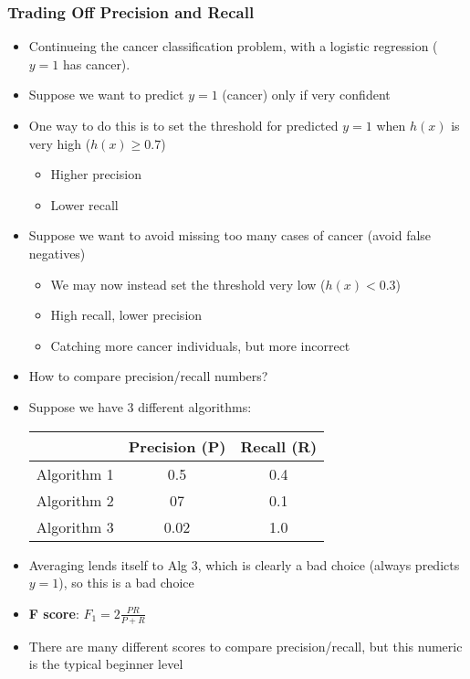 \subsubsection{Trading Off Precision and Recall}
\begin{itemize}[--]
	\item Continueing the cancer classification problem, with a logistic regression ($y=1$ has cancer).
	\item Suppose we want to predict $y=1$ (cancer) only if very confident
	\item One way to do this is to set the threshold for predicted $y=1$ when $h(x)$ is very high ($h(x)\geq 0.7$)
	\begin{itemize}[--]
		\item Higher precision
		\item Lower recall 
	\end{itemize}

	\item Suppose we want to avoid missing too many cases of cancer (avoid false negatives)
	\begin{itemize}[--]
		\item We may now instead set the threshold very low ($h(x)<0.3$)
		\item High recall, lower precision
		\item Catching more cancer individuals, but more incorrect 
	\end{itemize}	

	\item How to compare precision/recall numbers?
	\item Suppose we have 3 different algorithms:

	\begin{tabular}{c| c c}
		& Precision (P) & Recall (R)\\
		\hline
		Algorithm 1 & 0.5 & 0.4 \\
		Algorithm 2 & 07 & 0.1 \\
		Algorithm 3 & 0.02 & 1.0
	\end{tabular}

	\item Averaging lends itself to Alg 3, which is clearly a bad choice (always predicts $y=1$), so this is a bad choice
	\item \textbf{F score}: $F_1 = 2\frac{PR}{P+R}$
	\item There are many different scores to compare precision/recall, but this numeric is the typical beginner level
\end{itemize}


